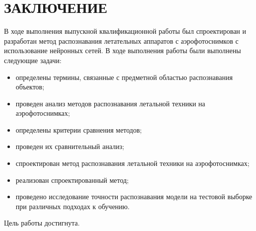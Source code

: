 \chapter*{ЗАКЛЮЧЕНИЕ}

В ходе выполнения выпускной квалификационной работы был спроектирован и разработан метод распознавания летательных аппаратов с аэрофотоснимков с использование нейронных сетей. В ходе выполнения работы были выполнены следующие задачи:
\begin{itemize}
	\item определены термины, связанные с предметной областью распознавания объектов;
	\item проведен анализ методов распознавания летальной техники на аэрофотоснимках;
	\item определены критерии сравнения методов;
	\item проведен их сравнительный анализ;
	\item спроектирован метод распознавания летальной техники на аэрофотоснимках;
	\item реализован спроектированный метод;
	\item проведено исследование точности распознавания модели на тестовой выборке при различных подходах к обучению.
\end{itemize}

Цель работы достигнута.